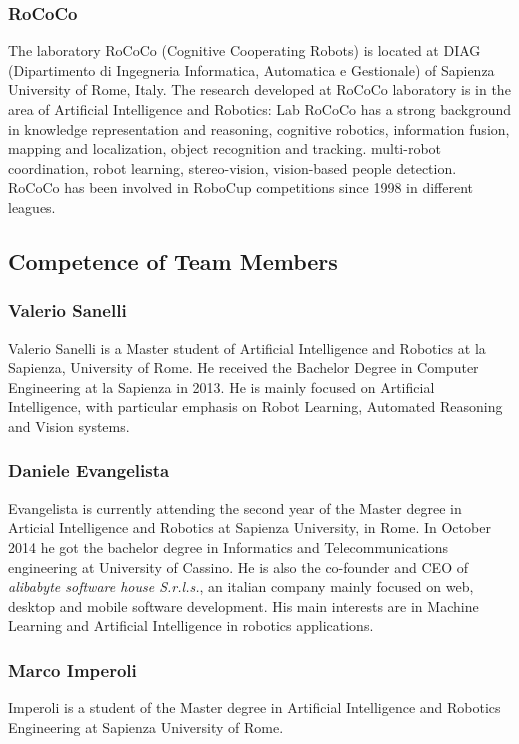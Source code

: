 \documentclass[conference]{IEEEtran}
\begin{document}
\subsubsection{RoCoCo} The laboratory RoCoCo (Cognitive Cooperating Robots) is located at DIAG (Dipartimento di Ingegneria Informatica, Automatica e Gestionale) of Sapienza University of Rome, Italy.
The research developed at RoCoCo laboratory is in the area of Artificial Intelligence and Robotics: Lab RoCoCo has a strong background in knowledge representation and reasoning, cognitive robotics, information fusion, mapping and localization, object recognition and tracking. multi-robot coordination, robot learning, stereo-vision, vision-based people detection. RoCoCo has been involved in RoboCup competitions since 1998 in different leagues.\\

\subsection{Competence of Team Members}

\subsubsection*{Valerio Sanelli}

Valerio Sanelli is a Master student of Artificial Intelligence and Robotics at la Sapienza, University of Rome.
He received the Bachelor Degree in Computer Engineering at la Sapienza in 2013.
He is mainly focused on Artificial Intelligence, with particular  emphasis on Robot Learning, Automated Reasoning and Vision systems.

\subsubsection*{Daniele Evangelista}
Evangelista is currently attending the second year of the Master degree in Articial Intelligence and Robotics at Sapienza University, in Rome. In October 2014 he got the bachelor degree in Informatics and Telecommunications engineering at University of Cassino. He is also the co-founder and CEO of \emph{alibabyte software house S.r.l.s.}, an italian company mainly focused on web, desktop and mobile software development. His main interests are in Machine Learning and Artificial Intelligence in robotics applications.

\subsubsection*{Marco Imperoli}
Imperoli is a student of the Master degree in Artificial Intelligence and Robotics Engineering at Sapienza University of Rome.
\end{document}
